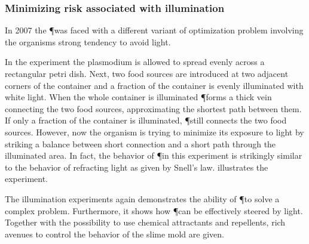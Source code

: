 		\subsubsection{Minimizing risk associated with illumination}

			In 2007 the \P was faced with a different variant of optimization problem involving the organisms strong tendency to avoid light. 

			In the experiment the plasmodium is allowed to spread evenly across a rectangular petri dish. Next, two food sources are introduced at two adjacent corners of the container and a fraction of the container is evenly illuminated with white light. When the whole container is illuminated \P forms a thick vein connecting the two food sources, approximating the shortest path between them. If only a fraction of the container is illuminated, \P still connects the two food sources. However, now the organism is trying to minimize its exposure to light by striking a balance between short connection and a short path through the illuminated area. In fact, the behavior of \P in this experiment is strikingly similar to the behavior of refracting light as given by Snell's law.  illustrates the experiment.

			The illumination experiments again demonstrates the ability of \P to solve a complex problem. Furthermore, it shows how \P can be effectively steered by light. Together with the possibility to use chemical attractants and repellents, rich avenues to control the behavior of the slime mold are given.


